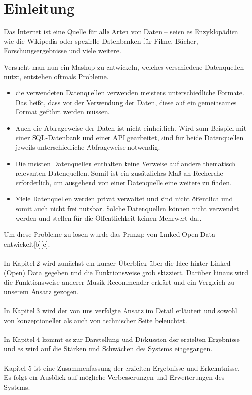 \section{Einleitung}

Das Internet ist eine Quelle für alle Arten von Daten -- seien es Enzyklopädien wie die Wikipedia oder spezielle Datenbanken für Filme, Bücher, Forschungsergebnisse und viele weitere.


Versucht man nun ein Mashup zu entwickeln, welches verschiedene Datenquellen nutzt, entstehen oftmals Probleme.

\begin{itemize}
\item die verwendeten Datenquellen verwenden meistens unterschiedliche Formate. Das heißt, dass vor der Verwendung der Daten, diese auf ein gemeinsames Format geführt werden müssen.
\item Auch die Abfrageweise der Daten ist nicht einheitlich. Wird zum Beispiel mit einer SQL-Datenbank und einer API gearbeitet, sind für beide Datenquellen jeweils unterschiedliche Abfrageweise notwendig.
\item Die meisten Datenquellen enthalten keine Verweise auf andere thematisch relevanten Datenquellen. Somit ist ein zusätzliches Maß an Recherche erforderlich, um ausgehend von einer Datenquelle eine weitere zu finden.
\item Viele Datenquellen werden privat verwaltet und sind nicht öffentlich und somit auch nicht frei nutzbar. Solche Datenquellen können nicht verwendet werden und stellen für die Öffentlichkeit keinen Mehrwert dar.
\end{itemize}

Um diese Probleme zu lösen wurde das Prinzip von Linked Open Data entwickelt[b][c].

\paragraph{} In Kapitel 2 wird zunächst ein kurzer Überblick über die Idee hinter Linked (Open) Data gegeben und die Funktionsweise grob skizziert. Darüber hinaus wird die Funktionsweise anderer Musik-Recommender erklärt und ein Vergleich zu unserem Ansatz gezogen.

\paragraph{} In Kapitel 3 wird der von uns verfolgte Ansatz im Detail erläutert und sowohl von konzeptioneller als auch von technischer Seite beleuchtet.

\paragraph{} In Kapitel 4 kommt es zur Darstellung und Diskussion der erzielten Ergebnisse und es wird auf die Stärken und Schwächen des Systems eingegangen.

\paragraph{} Kapitel 5 ist eine Zusammenfassung der erzielten Ergebnisse und Erkenntnisse. Es folgt ein Ausblick auf mögliche Verbesserungen und Erweiterungen des Systems.